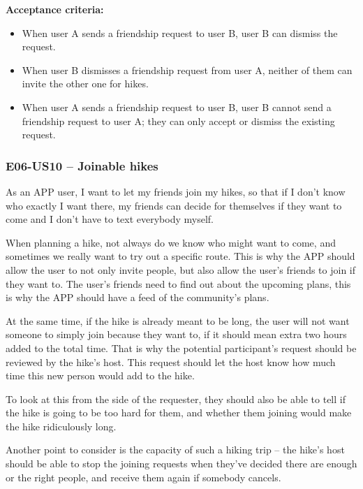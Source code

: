 \textbf{Acceptance criteria:} 
\begin{itemize}
    \item When user A sends a friendship request to user B, user B can dismiss the request.
    \item When user B dismisses a friendship request from user A, neither of them can invite the other one for hikes.
    \item When user A sends a friendship request to user B, user B cannot send a friendship request to user A; they can only accept or dismiss the existing request.
\end{itemize}



\subsubsection*{E06-US10 -- Joinable hikes}
As an APP user, I want to let my friends join my hikes, so that if I don't know who exactly I want there, my friends can decide for themselves if they want to come and I don't have to text everybody myself.

When planning a hike, not always do we know who might want to come, and sometimes we really want to try out a specific route.
This is why the APP should allow the user to not only invite people, but also allow the user's friends to join if they want to.
The user's friends need to find out about the upcoming plans, this is why the APP should have a feed of the community's plans.

At the same time, if the hike is already meant to be long, the user will not want someone to simply join because they want to, if it should mean extra two hours added to the total time.
That is why the potential participant's request should be reviewed by the hike's host.
This request should let the host know how much time this new person would add to the hike.

To look at this from the side of the requester, they should also be able to tell if the hike is going to be too hard for them, and whether them joining would make the hike ridiculously long.

Another point to consider is the capacity of such a hiking trip -- the hike's host should be able to stop the joining requests when they've decided there are enough or the right people, and receive them again if somebody cancels.

